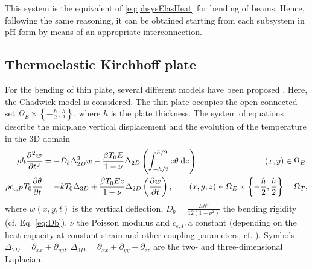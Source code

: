 This system is the equivalent of \eqref{eq:phsysElasHeat} for bending of beams. Hence, following the same reasoning, it can be obtained starting from each subsystem in pH form by means of an appropriate interconnection.
\subsection{Thermoelastic Kirchhoff plate}
For the bending of thin plate, several different models have been proposed \cite{chadwick1962propagation,lagnese1989,simmonds1999,norris2006}. Here, the Chadwick model \cite{chadwick1962propagation} is considered. The thin plate occupies the open connected set $\Omega_E \times \left\{-\frac{h}{2}, \frac{h}{2}\right\}$, where $h$ is the plate thickness. The system of equations describe the midplane vertical displacement and the evolution of the temperature in the 3D domain
\begin{equation}\label{eq:heatplate}
\begin{aligned}
\rho h \diffp[2]{w}{t} &= -D_b \Delta^2_{2D} w - \frac{\beta T_0 E}{1 - \nu} \Delta_{2D} \left(\int_{-h/2}^{h/2} z \theta \d{z}\right), \qquad\qquad\qquad\quad\;\, \ (x, y)\in \Omega_E,\\
\rho c_{\epsilon, P} T_0 \diffp{\theta}{t} &= - k T_0 \Delta_{3D} + \frac{\beta T_0 E z}{1-\nu}  \Delta_{2D} \left(\diffp{w}{t}\right), \qquad (x, y, z)\in \Omega_E \times \left\{-\frac{h}{2}, \frac{h}{2}  \right\} = \Omega_T,
\end{aligned}
\end{equation} 
where $w(x,y,t)$ is the vertical deflection, $D_b = \frac{E h^3}{12(1-\nu^2)}$ the bending rigidity (cf. Eq. \eqref{eq:Db}), $\nu$ the Poisson modulus and $c_{\epsilon, P}$ a constant (depending on the heat capacity at constant strain and other coupling parameters, cf. \cite{chadwick1962propagation}). Symbols $\Delta_{2D} = \partial_{xx} + \partial_{yy}, \; \Delta_{3D} = \partial_{xx} + \partial_{yy} + \partial_{zz}$ are the two- and three-dimensional Laplacian. \\


